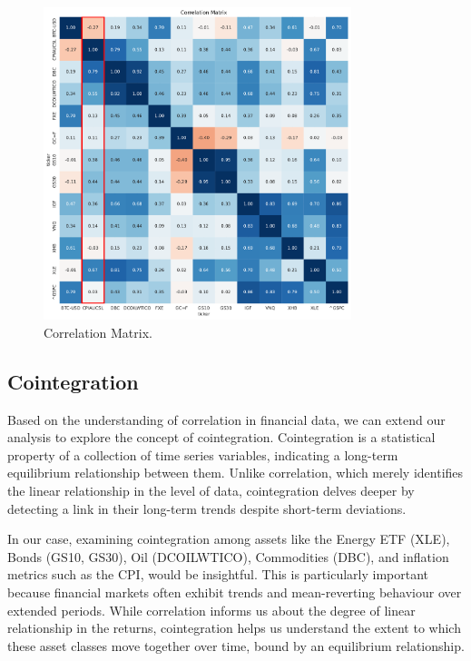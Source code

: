 \documentclass{article}
\begin{document}
\begin{figure}[H]
    \centering
    \includegraphics[width=0.8\textwidth]{figure/Correlation_Matrix.pdf}
    \caption{Correlation Matrix.}
    \label{fig:mesh1}
\end{figure}


\subsection{Cointegration}

Based on the understanding of correlation in financial data, we can extend our analysis to explore the concept of cointegration. Cointegration is a statistical property of a collection of time series variables, indicating a long-term equilibrium relationship between them. Unlike correlation, which merely identifies the linear relationship in the level of data, cointegration delves deeper by detecting a link in their long-term trends despite short-term deviations.

In our case, examining cointegration among assets like the Energy ETF (XLE), Bonds (GS10, GS30), Oil (DCOILWTICO), Commodities (DBC), and inflation metrics such as the CPI, would be insightful. This is particularly important because financial markets often exhibit trends and mean-reverting behaviour over extended periods. While correlation informs us about the degree of linear relationship in the returns, cointegration helps us understand the extent to which these asset classes move together over time, bound by an equilibrium relationship.
\end{document}
